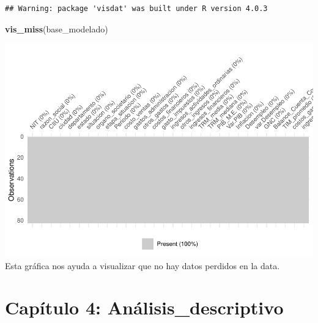 \documentclass[
  11pt,
]{article}
\newenvironment{Shaded}{\begin{snugshade}}{\end{snugshade}}
\newcommand{\DataTypeTok}[1]{\textcolor[rgb]{0.13,0.29,0.53}{#1}}
\newcommand{\KeywordTok}[1]{\textcolor[rgb]{0.13,0.29,0.53}{\textbf{#1}}}
\newcommand{\NormalTok}[1]{#1}
\newcommand{\OperatorTok}[1]{\textcolor[rgb]{0.81,0.36,0.00}{\textbf{#1}}}
\newcommand{\StringTok}[1]{\textcolor[rgb]{0.31,0.60,0.02}{#1}}
\begin{document}
\begin{verbatim}
## Warning: package 'visdat' was built under R version 4.0.3
\end{verbatim}

\begin{Shaded}
\begin{Highlighting}[]
\KeywordTok{vis_miss}\NormalTok{(base_modelado)}
\end{Highlighting}
\end{Shaded}

\includegraphics{index_files/figure-latex/unnamed-chunk-4-1.pdf} Esta
gráfica nos ayuda a visualizar que no hay datos perdidos en la data.

\hypertarget{capuxedtulo-4-anuxe1lisis_descriptivo}{%
\section{Capítulo 4:
Análisis\_descriptivo}\label{capuxedtulo-4-anuxe1lisis_descriptivo}}

\begin{Shaded}
\end{Shaded}
\end{document}
